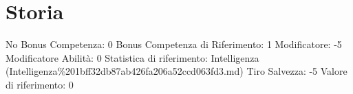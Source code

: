 \section{Storia}\label{storia}

\begin{description}
\tightlist
\item[Tags: ABI]
No Bonus Competenza: 0 Bonus Competenza di Riferimento: 1 Modificatore:
-5 Modificatore Abilità: 0 Statistica di riferimento: Intelligenza
(Intelligenza\%201bff32db87ab426fa206a52ccd063fd3.md) Tiro Salvezza: -5
Valore di riferimento: 0
\end{description}
